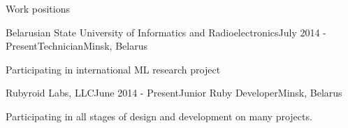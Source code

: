 \documentclass{resume} %
\begin{document}

\begin{rSection}{Work positions}

\begin{rSubsection}{Belarusian State University of Informatics and Radioelectronics}{July 2014 - Present}{Technician}{Minsk, Belarus}
\item Participating in international ML research project
\end{rSubsection}

\begin{rSubsection}{Rubyroid Labs, LLC}{June 2014 - Present}{Junior Ruby Developer}{Minsk, Belarus}
\item Participating in all stages of design and development on many projects.
\end{rSubsection}

\end{rSection}


%
%
%
%


\end{document}
